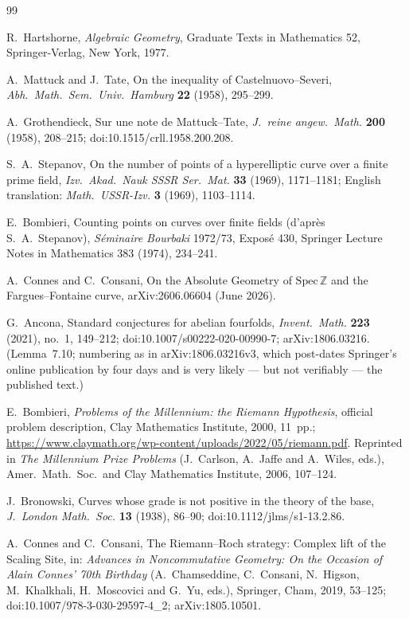 \documentclass[11pt]{article}
\theoremstyle{definition}
\theoremstyle{remark}
\begin{document}
\begin{thebibliography}{99}

R.~Hartshorne,
\emph{Algebraic Geometry},
Graduate Texts in Mathematics 52, Springer-Verlag, New York, 1977.

A.~Mattuck and J.~Tate,
On the inequality of Castelnuovo--Severi,
\emph{Abh.\ Math.\ Sem.\ Univ.\ Hamburg} \textbf{22} (1958), 295--299.

A.~Grothendieck,
Sur une note de Mattuck--Tate,
\emph{J.\ reine angew.\ Math.} \textbf{200} (1958), 208--215;
doi:10.1515/crll.1958.200.208.

S.~A.~Stepanov,
On the number of points of a hyperelliptic curve over a finite prime field,
\emph{Izv.\ Akad.\ Nauk SSSR Ser.\ Mat.} \textbf{33} (1969), 1171--1181;
English translation: \emph{Math.\ USSR-Izv.} \textbf{3} (1969), 1103--1114.

E.~Bombieri,
Counting points on curves over finite fields (d'apr\`es S.~A.~Stepanov),
\emph{S\'eminaire Bourbaki} 1972/73, Expos\'e 430,
Springer Lecture Notes in Mathematics 383 (1974), 234--241.

A.~Connes and C.~Consani,
On the Absolute Geometry of $\mathrm{Spec}\,\mathbb{Z}$ and the
Fargues--Fontaine curve,
arXiv:2606.06604 (June 2026).

G.~Ancona,
Standard conjectures for abelian fourfolds,
\emph{Invent.\ Math.} \textbf{223} (2021), no.~1, 149--212;
doi:10.1007/s00222-020-00990-7; arXiv:1806.03216.
(Lemma~7.10; numbering as in arXiv:1806.03216v3, which post-dates Springer's
online publication by four days and is very likely --- but not verifiably --- the
published text.)

E.~Bombieri,
\emph{Problems of the Millennium: the Riemann Hypothesis},
official problem description, Clay Mathematics Institute, 2000, 11~pp.;
\url{https://www.claymath.org/wp-content/uploads/2022/05/riemann.pdf}.
Reprinted in \emph{The Millennium Prize Problems} (J.~Carlson, A.~Jaffe and
A.~Wiles, eds.), Amer.\ Math.\ Soc.\ and Clay Mathematics Institute, 2006,
107--124.

J.~Bronowski,
Curves whose grade is not positive in the theory of the base,
\emph{J.\ London Math.\ Soc.} \textbf{13} (1938), 86--90;
doi:10.1112/jlms/s1-13.2.86.

A.~Connes and C.~Consani,
The Riemann--Roch strategy: Complex lift of the Scaling Site,
in: \emph{Advances in Noncommutative Geometry: On the Occasion of Alain
Connes' 70th Birthday} (A.~Chamseddine, C.~Consani, N.~Higson, M.~Khalkhali,
H.~Moscovici and G.~Yu, eds.), Springer, Cham, 2019, 53--125;
doi:10.1007/978-3-030-29597-4\_2; arXiv:1805.10501.


\end{thebibliography}
\end{document}
